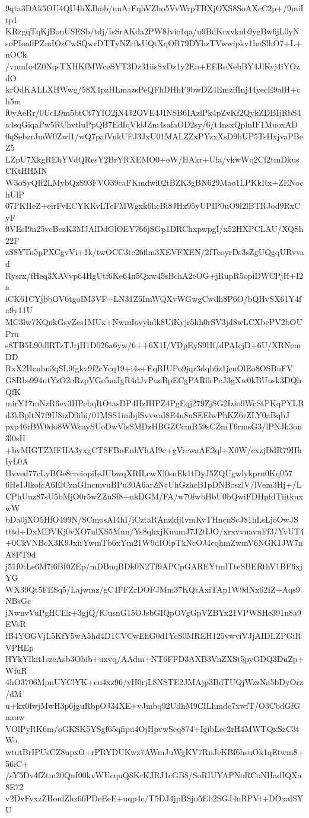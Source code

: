 9qta3DAk5OU4QU4hXJhob/nuArFqhVZbo5VvWrpTBXjOXS8SoAXcC2p+/9miItp1
KRzgqTqKjBonUSESb/tdj/IsSrAKda2PW8Ivic1qa/u9BdKrxvknb9ygBw6jL0yN
soPIoa0PZmIOzCwSQwrDTTyNZr0sUQtXqOR79DYhzTVwwipkv1haSlhO7+L+nOCk
/vnmIo4Z0NqsTXHKfMWceSYT3Dz31iisSxDz1y2En+EEReNebBY4JlKvj4iYOzdO
krOdKALLXHWwg/58X4pzHLmazsPeQFhDHhF9bwDZ4EmzifInj44yecE9alH+ch5m
f0yAeRr/0UcL9m5btCt7YIO2jN4J2OVE4JINSB6IAzlPk4pZvKf2QykZDBIjRbS4
a4sqGiqaPw5RUhvtluPpQB7EdIqVklJZm4safaOD2sy/6/t4nsxQplnIF1MuoxAD
0qSebzrJmW0Zwf1/wQ7pafVnkUFJ3JxU01MALZZxPYzxXsD9hUP5TsHxjvaPBeZ5
LZpU7XkgREbYVdQResY2BrYRXEMO0+eW/HAkr+Ufa/vkwWq2Cf2tmDkusCKtHHMN
W3oSyQIf2LMybQzS93FVO39caFKmdwi02tBZK3gBN629Mao1LPKkRx+ZENochUlP
07PKIIeZ+eirFvECYKKvLTeFMWgxk6hcBi8JHx95yUPIP0uO9l2lBTRJod9RxCyF
0VEsI9n25vcBczK3MJAlDdGlOEY766jSGp1DRChxpwpgI/x52HXPCLAU/XQSh22F
zS8YTu5pPXCgvVi+1k/twOCC3te26flm3XEVFXEN/2fTcoyrDs3sZgUQgqURvvad
Rysrx/fHeq3XAVvp64HgUtf6Ke64u5Qxw45sBchA2eOG+jRupR5opiDWCPjH+I2a
iCK61CYjbbOV6tgoIM3VF+LN31Z5ImWQXvWGwgCwdh8P6O/bQHvSX61Y4fa9y11U
MC3lw7KQnkGsyZes1MUx+NwmIovyhdk8UiKyjr5hh0rSV3jd8wLCXbePV2bOUPru
s8TB5L90dlRTzTJrjH1D026a6yw/6++6X1I/VDpEyS9Hf/dPAIcjD+6U/XRNemDD
RxX2Hcnhn3qSL9fgkv9f2cYcq19+i4s+EqRIUPo9jqr3dqb6z1jenOlEo8OSBuFV
G8Rbs994utYzO2oRzpVGe5mJgR4dJvPueBpECgPAR0rPcJ3gXw0kBUusk3DQhQfK
mirY17mNzR6ev3HPebqItOtasDP4HzIHPZ4PgEqj279ZjSG2Izio9WcStPKqPYLB
d3kBpltN7f9U8izD0ibi/01MSS1imbjlSvvwal8E4u8uSEElwPhKZ6rZLY0aBqbJ
pxp46rBW0do8WWcaySUoDwVlsSMDzHBGZCcmR59sCZmT6rmsG3/lPNJh3on3l0sH
+bvMIGTZMFHA3yxgCTSFBnEnhVhAI9c+gVrcwaAE2ql+X0W/cxzjDdR79HhIyL0A
Hvved77cLyBGe8creiopiIeJUbwqXRILcwXl0snEk1tDyJ5ZQUgwlykprn0Kq057
6He1JlkofcA6ElCznGIncmvuBPu30A6arZNcUhGzhcB1pDNBoszlV/lVem3Hj+/L
CPhUuz87sU5bMjO0r5wZZuSf8+nkDGM/FA/w70fwbHbU0bQwiFDHpfdTiitkuxwW
bDa0jXO5HfO499N/SCmosAI4hI/iCztaRAnzkfjIvmKvTHncnScJ81hLsLjoOwJS
tttd+DxMDVKj0vXO7nlXS5Mnn/Ys8qhxjKuumJ7J2tIJO/xrxvvuavuFf3/YvUT4
+0CkVNBcX3K9JxirYwmTb6xYm21W9dIOlpTkNcOJ4cqhmZwmV6NGK1JW7nA8FT9d
j51f0tLe6M7i6BI0ZEp/mDBnqBDk0N2Tf9APCpGAREYtmlTteSBERthV1BF6xjYG
WX39Qt5FESq5/Lajwmz/gC4FFZrDOFJMm37KQtAxiTAp1W9dNx62IZ+Aqs9NBsGc
jNwnvVuPgHCEk+3gjQ/fCusnG15OJsbGIQpOVgGpVZBYx21VPWSHe391n8a9EVsR
fB4YOGVjL5KfY5wA5hd4D1CVCwEhG0d1YcS0MREH125vwviVJjAIDLZPGiRVPHEp
HYkYIkit1szcAsb3Obib+uxvq/AAdm+NT6FFD3AXB3VnZXSt5pyODQ3DuZp+WfuR
4hO3706MpnUYClYK+eu4xz96/yH0rjL8NSTE2JMAjp3BdTUQjWzzNa5bDyOrz/dM
u+kx0fwjMwH3p6jguRbpOJ34XE+vJmbq92UdhM9CILhmdc7xwfT/O3CbdGfGnauw
VOlPyRK6m/oGKSK5YSgf65qfipu4OjHpvwSeq874+IgibLee2rH4MWTQxSzC3tWo
wtutBrIPUsCZ8npxO+rPRYDUKwz7AWmJuWgKV7RnJeKBf6hsuOk1qEtwm8+56iC+
/sY5Dv4fZtm20QnI00kvWUcquQ8KrKJRJ1cGB8/SoRIUYAPNoRCoNHadIQXa8E72
v2DvFyxzZHonlZhz66PDeEeE+uqp4c/T5DJ4jpBSju5Eb2SGJ4nRPVt+DOxalSYU
